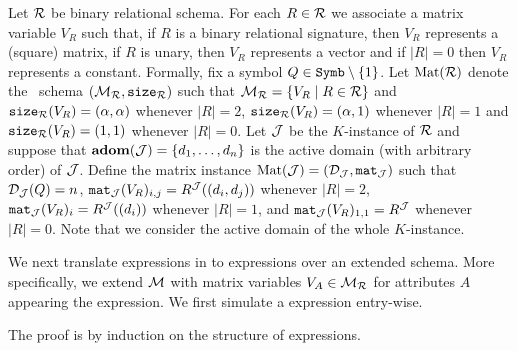 Let $\mathcal{R}$ be binary relational schema. For each $R\in \mathcal{R}$ we associate a matrix variable 
$V_R$ such that, if $R$ is a binary relational signature, then $V_R$ represents a (square) matrix, 
if $R$ is unary, then $V_R$ represents a vector and if $|R|=0$ then $V_R$ represents a constant. Formally, 
fix a symbol $Q \in \texttt{Symb} \setminus \{1\}$. Let $\text{Mat}(\mathcal{R})$ denote the \lang \ schema
$(\mathcal{M}_{\mathcal{R}},\texttt{size}_{\mathcal{R}})$ such that $\mathcal{M}_{\mathcal{R}} = \{ V_R \mid R \in \mathcal{R}\}$ and $\texttt{size}_{\mathcal{R}}(V_R) = (\alpha, \alpha)$ 
whenever $|R| = 2$, $\texttt{size}_{\mathcal{R}}(V_R) = (\alpha, 1)$ whenever $|R|=1$ and $\texttt{size}_{\mathcal{R}}(V_R) = (1, 1)$ whenever $|R|=0$. 
Let $\mathcal{J}$ be the $K$-instance of $\mathcal{R}$ and suppose that $\mathbf{adom}(\mathcal{J}) = \{d_1, \ldots, d_n\}$ is 
the active domain (with arbitrary order) of $\mathcal{J}$. 
Define the matrix instance $\text{Mat}(\mathcal{J}) = (\mathcal{D}_{\mathcal{J}},\texttt{mat}_{\mathcal{J}})$ such 
that $\mathcal{D}_{\mathcal{J}}(Q) = n$, $\texttt{mat}_{\mathcal{J}}(V_R)_{i,j} = R^{\mathcal{J}}((d_i, d_j))$ whenever $|R|=2$, $\texttt{mat}_{\mathcal{J}}(V_R)_{i} = R^{\mathcal{J}}((d_i))$ 
whenever $|R|=1$, 
and $\texttt{mat}_{\mathcal{J}}(V_R)_{1,1} = R^{\mathcal{J}}$ whenever $|R|=0$. 
Note that we consider the active domain of the whole $K$-instance.

We next translate \rak expressions in to \langsum expressions over an extended schema. More specifically, we extend 
$\mathcal{M}$ with matrix variables $V_A\in\mathcal{M}_{\mathcal{R}} $ for attributes $A$ appearing the \rak expression. We first simulate a \rak expression entry-wise.

The proof is by induction on the structure of expressions.

